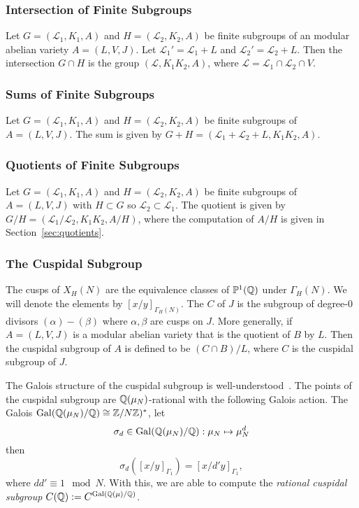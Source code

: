 \documentclass{article}
\begin{document}
\subsubsection{Intersection of Finite Subgroups}

Let $G=(\mathcal{L}_1, K_1, A)$ and $H=(\mathcal{L}_2, K_2, A)$ be finite
subgroups of an modular abelian variety $A=(L, V, J)$. Let $\mathcal{L}_1 ' =
\mathcal{L}_1+L$ and $\mathcal{L}_2 ' = \mathcal{L}_2 + L$. Then the
intersection $G\cap H$ is the group $(\mathcal{L}, K_1K_2, A)$, where
$\mathcal{L}=\mathcal{L}_1\cap \mathcal{L}_2 \cap V$.

\subsubsection{Sums of Finite Subgroups}

Let $G=(\mathcal{L}_1, K_1, A)$ and $H=(\mathcal{L}_2, K_2, A)$ be finite
subgroups of $A=(L, V, J)$. The sum is given by $G+H=(\mathcal{L}_1 +
\mathcal{L}_2+L, K_1K_2, A)$.

\subsubsection{Quotients of Finite Subgroups}

Let $G=(\mathcal{L}_1, K_1, A)$ and $H=(\mathcal{L}_2, K_2, A)$ be finite
subgroups of $A=(L, V, J)$ with $H\subset G$ so $\mathcal{L}_2\subset
\mathcal{L}_1$. The quotient is given by $G/H=(\mathcal{L}_1/\mathcal{L}_2,
K_1K_2, A/H)$, where the computation of $A/H$ is given in
Section~\ref{sec:quotients}.


\subsubsection{The Cuspidal Subgroup}

The cusps of $X_H(N)$ are the equivalence classes of $\mathbb{P}^1(\mathbb{Q})$ under
$\Gamma_H(N)$. We will denote the elements by $[x/y]_{\Gamma_H(N)}$. The
 $C$ of $J$ is the subgroup of degree-0 divisors
$(\alpha)-(\beta)$ where $\alpha, \beta$ are cusps on $J$. More generally, if
$A=(L, V, J)$ is a modular abelian variety that is the quotient of $B$ by $L$.
Then the cuspidal subgroup of $A$ is defined to be $(C\cap B)/L$, where $C$ is
the cuspidal subgroup of $J$. 

The Galois structure of the cuspidal subgroup is well-understood~\cite[\S
1.3]{MR670070}. The points of the cuspidal subgroup are $\mathbb{Q}(\mu_N)$-rational
with the following Galois action. The Galois $\operatorname{Gal}(\mathbb{Q}(\mu_N)/\mathbb{Q})\cong
\mathbb{Z}/N\mathbb{Z})^*$, let
\[
    \sigma_d\in \operatorname{Gal}(\mathbb{Q}(\mu_N)/\mathbb{Q}):\mu_N\mapsto \mu_N ^d
\]
then
\[
    \sigma_d([x/y]_{\Gamma_1})=[x/d'y]_{\Gamma_1},
\]
where $dd'\equiv 1 \mod{N}$. With this, we are able to compute the
\emph{rational cuspidal subgroup} $C(\mathbb{Q}):=C^{\operatorname{Gal}(\mathbb{Q}(\mu)/\mathbb{Q})}$.
\end{document}
